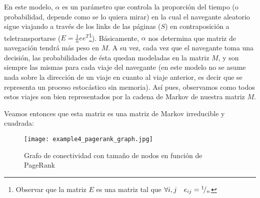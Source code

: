 \par En este modelo, $\alpha$ es un par\'ametro que controla la proporci\'on del
tiempo (o probabilidad, depende como se lo quiera mirar) en la cual el navegante
aleatorio sigue viajando a trav\'es de los links de las p\'aginas ($S$)
en contraposici\'on a teletransportarse ($E = \frac{1}{n}ee^T$\footnote{Observar
que la matriz $E$ es una matriz tal que $\forall i,j \quad e_{ij} =
{}^{1}\!/_{n}$}). B\'asicamente, $\alpha$ nos determina que matriz de
navegaci\'on tendr\'a m\'as peso en $M$. A su vez, cada vez que el navegante
toma una decisi\'on, las probabilidades de \'esta quedan modeladas en la
matriz $M$, y son siempre las mismas para cada viaje del navegante (en este modelo
no se asume nada sobre la direcci\'on de un viaje en cuanto al viaje anterior,
es decir que se representa un proceso estoc\'astico sin memoria). As\'i pues,
observamos como todos estos viajes son bien representados por la cadena de
Markov de nuestra matriz $M$.

\par Veamos entonces que esta matriz es una matriz de Markov irreducible y
cuadrada:

\begin{wrapfigure}[20]{r}{0.5\textwidth}
    \centering
    \texttt{[image: example4\_pagerank\_graph.jpg]}
    \caption{Grafo de conectividad con tama\~no de nodos en funci\'on de
        PageRank~\cite{wiki_pagerank}}
\end{wrapfigure}
\noindent

